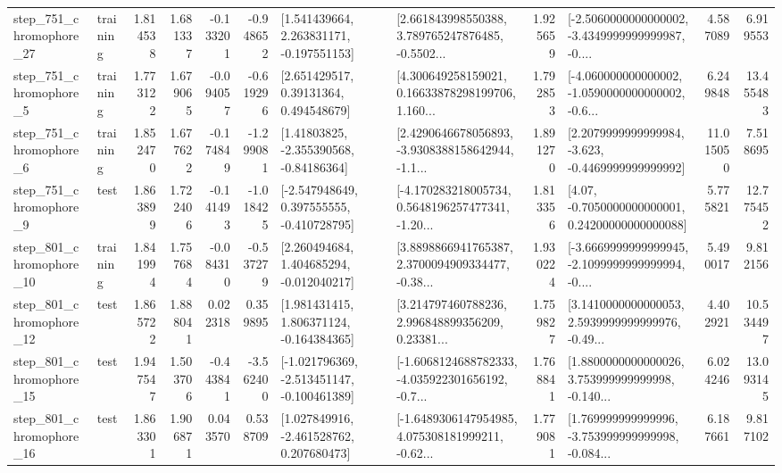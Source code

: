\begin{tabular}{llrrrrllrlrr}
  step\_751\_chromophore\_27 &  training &      1.814538 &    1.681337 &     -0.133201 & -0.948652 &    [1.541439664, 2.263831171, -0.197551153] &  [2.661843998550388, 3.789765247876485, -0.5502... &       1.925659 &  [-2.5060000000000002, -3.4349999999999987, -0.... &            4.587089 &          6.919553 \\
   step\_751\_chromophore\_5 &  training &      1.773122 &    1.679065 &     -0.094057 & -0.619296 &      [2.651429517, 0.39131364, 0.494548679] &  [4.300649258159021, 0.16633878298199706, 1.160... &       1.792853 &  [-4.060000000000002, -1.0590000000000002, -0.6... &            6.249848 &         13.455483 \\
   step\_751\_chromophore\_6 &  training &      1.852470 &    1.677622 &     -0.174849 & -1.299081 &     [1.41803825, -2.355390568, -0.84186364] &  [2.4290646678056893, -3.9308388158642944, -1.1... &       1.891270 &  [2.2079999999999984, -3.623, -0.4469999999999992] &           11.015050 &          7.518695 \\
   step\_751\_chromophore\_9 &      test &      1.863899 &    1.722406 &     -0.141493 & -1.018425 &   [-2.547948649, 0.397555555, -0.410728795] &  [-4.170283218005734, 0.5648196257477341, -1.20... &       1.813356 &   [4.07, -0.7050000000000001, 0.24200000000000088] &            5.775821 &         12.775452 \\
  step\_801\_chromophore\_10 &  training &      1.841994 &    1.757684 &     -0.084310 & -0.537279 &    [2.260494684, 1.404685294, -0.012040217] &  [3.8898866941765387, 2.3700094909334477, -0.38... &       1.930224 &  [-3.6669999999999945, -2.1099999999999994, -0.... &            5.490017 &          9.812156 \\
  step\_801\_chromophore\_12 &      test &      1.865722 &    1.888041 &      0.022318 &  0.359895 &    [1.981431415, 1.806371124, -0.164384365] &  [3.214797460788236, 2.996848899356209, 0.23381... &       1.759827 &  [3.1410000000000053, 2.5939999999999976, -0.49... &            4.402921 &         10.534497 \\
  step\_801\_chromophore\_15 &      test &      1.947547 &    1.503706 &     -0.443841 & -3.562400 &  [-1.021796369, -2.513451147, -0.100461389] &  [-1.6068124688782333, -4.035922301656192, -0.7... &       1.768841 &  [1.8800000000000026, 3.753999999999998, -0.140... &            6.024246 &         13.093145 \\
  step\_801\_chromophore\_16 &      test &      1.863301 &    1.906871 &      0.043570 &  0.538709 &    [1.027849916, -2.461528762, 0.207680473] &  [-1.6489306147954985, 4.075308181999211, -0.62... &       1.779081 &  [1.769999999999996, -3.753999999999998, -0.084... &            6.187661 &          9.817102 \\

\end{tabular}
